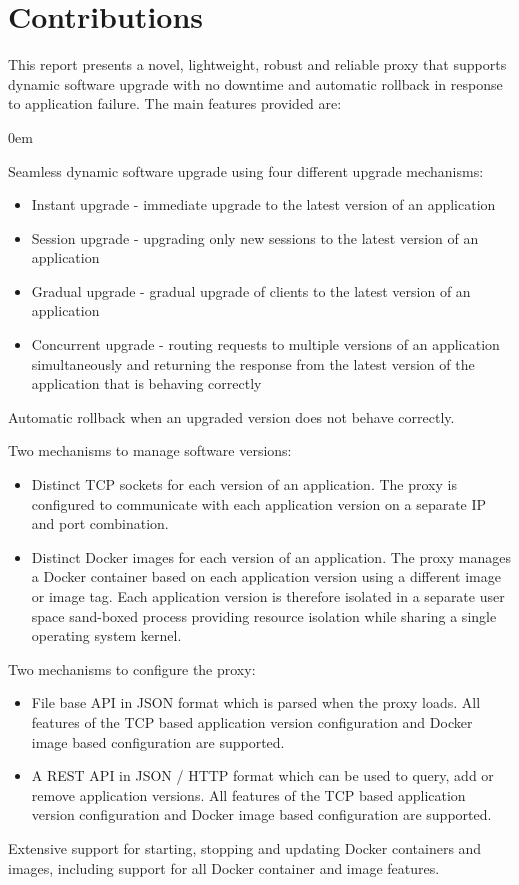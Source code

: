 \documentclass[a4paper,11pt,twoside]{report}
\begin{document}
\section{Contributions}
This report presents a novel, lightweight, robust and reliable proxy that supports dynamic software upgrade with no downtime and automatic rollback in response to application failure. The main features provided are:
\begin{list}{-}{}
\itemsep0em
\item Seamless dynamic software upgrade using four different upgrade mechanisms:
	\begin{itemize}
		\item{Instant upgrade} - immediate upgrade to the latest version of an application 
		\item{Session upgrade} - upgrading only new sessions to the latest version of an application 
		\item{Gradual upgrade} - gradual upgrade of clients to the latest version of an application
		\item{Concurrent upgrade} - routing requests to multiple versions of an application simultaneously and returning the response from the latest version of the application that is behaving correctly 
	\end{itemize}
\item Automatic rollback when an upgraded version does not behave correctly. 
\item Two mechanisms to manage software versions:
	\begin{itemize}
		\item Distinct TCP sockets for each version of an application.  The proxy is configured to communicate with each application version on a separate IP and port combination.
		\item Distinct Docker images for each version of an application.  The proxy manages a Docker container based on each application version using a different image or image tag.  Each application version is therefore isolated in a separate user space sand-boxed process providing resource isolation while sharing a single operating system kernel. 
	\end{itemize}
\item Two mechanisms to configure the proxy:
	\begin{itemize}
		\item File base API in JSON format which is parsed when the proxy loads. All features of the TCP based application version configuration and Docker image based configuration are supported.
		\item A REST API in JSON / HTTP format which can be used to query, add or remove application versions.  All features of the TCP based application version configuration and Docker image based configuration are supported.
	\end{itemize}
\item Extensive support for starting, stopping and updating Docker containers and images, including support for all Docker container and image features.	
\end{list}
\end{document}
